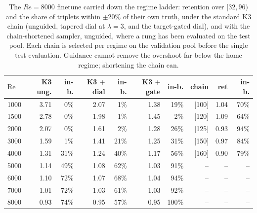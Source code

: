 \begin{table}[t]
  \centering
  \caption{The $Re{=}8000$ finetune carried down the regime ladder: retention over $[32,96)$ and the share of triplets within $\pm20\%$ of their own truth, under the standard K3 chain (unguided, tapered dial at $\lambda=3$, and the target-gated dial), and with the chain-shortened sampler, unguided, where a rung has been evaluated on the test pool. Each chain is selected per regime on the validation pool before the single test evaluation. Guidance cannot remove the overshoot far below the home regime; shortening the chain can.}
  \label{tab:re8k-downward}
  \begin{tabular}{lrrrrrrrrr}
    \toprule
    $\mathrm{Re}$ & K3 ung. & in-b. & K3 $+$dial & in-b. & K3 $+$gate & in-b. & chain & ret & in-b. \\
    \midrule
    1000 & 3.71 & 0\% & 2.07 & 1\% & 1.38 & 19\% & [100] & 1.04 & 70\% \\
    1500 & 2.78 & 0\% & 1.98 & 1\% & 1.45 & 2\% & [120] & 1.09 & 64\% \\
    2000 & 2.07 & 0\% & 1.61 & 2\% & 1.28 & 26\% & [125] & 0.93 & 94\% \\
    3000 & 1.59 & 1\% & 1.41 & 21\% & 1.25 & 31\% & [150] & 0.97 & 84\% \\
    4000 & 1.31 & 31\% & 1.24 & 40\% & 1.17 & 56\% & [160] & 0.90 & 79\% \\
    5000 & 1.14 & 49\% & 1.08 & 62\% & 1.03 & 91\% & -- & -- & -- \\
    6000 & 1.10 & 72\% & 1.07 & 68\% & 1.04 & 94\% & -- & -- & -- \\
    7000 & 1.01 & 72\% & 1.03 & 61\% & 1.03 & 92\% & -- & -- & -- \\
    8000 & 0.93 & 74\% & 0.95 & 57\% & 0.95 & 100\% & -- & -- & -- \\
    \bottomrule
  \end{tabular}
\end{table}
